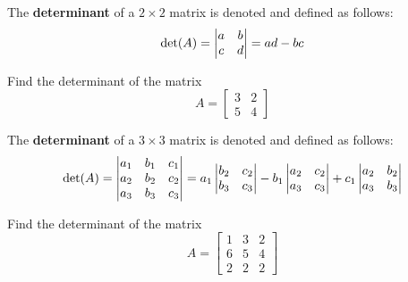 \begin{definition}
    The \textbf{determinant} of a $2 \times 2$ matrix is denoted and defined as follows:
\begin{equation*}
\textnormal{det}(A) = 
\begin{vmatrix}
a & b \\
c & d
\end{vmatrix} = ad-bc
\end{equation*}

    \end{definition}

\begin{example}
    Find the determinant of the matrix \begin{equation*}
A = 
\begin{bmatrix}
3 & 2 \\
5 & 4
\end{bmatrix}
\end{equation*}
\end{example}

\begin{definition}
    The \textbf{determinant} of a $3 \times 3$ matrix is denoted and defined as follows:
\begin{equation*}
\textnormal{det}(A) = 
\begin{vmatrix}
a_1 & b_1 & c_1 \\
a_2 & b_2 & c_2 \\
a_3 & b_3 & c_3 \\
\end{vmatrix} = a_1\begin{vmatrix}
b_2 & c_2 \\
b_3 & c_3
\end{vmatrix} - b_1\begin{vmatrix}
a_2 &  c_2 \\
a_3 &  c_3
\end{vmatrix} + c_1\begin{vmatrix}
a_2 & b_2 \\
a_3 & b_3 \\
\end{vmatrix}
\end{equation*}

    \end{definition}

\begin{example}\label{det3d}
    Find the determinant of the matrix \begin{equation*}
A = 
\begin{bmatrix}
1 & 3 & 2 \\
6 & 5 & 4 \\
2 & 2 & 2
\end{bmatrix}
\end{equation*}
\end{example}

